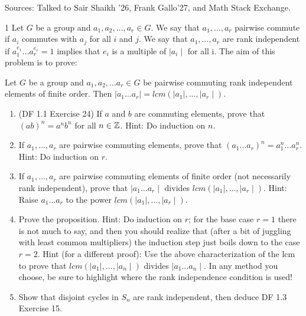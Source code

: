 \documentclass[12pt]{article}
\begin{document}


Sources: Talked to Sair Shaikh '26, Frank Gallo'27, and Math Stack Exchange. 
\begin{problem}{1}
    Let $G$ be a group and $a_1, a_2, \ldots, a_r \in G$. We say that $a_1, \ldots, a_r$ pairwise commute if $a_i$ commutes with $a_j$ for all $i$ and $j$. We say that $a_1, \ldots, a_r$ are rank independent if $a_1^{e_1} \ldots a_r^{e_r} =1$ implies that $e_i$ is a multiple of $\mid a_i \mid$ for all i. The aim of this problem is to prove: 
    \begin{proposition}
        Let $G$ be a group and $a_1, a_2, \ldots a_r \in G$ be pairwise commuting rank independent elements of finite order. Then $\mid a_1 \ldots a_r \mid = lcm(\mid a_1 \mid, \ldots, \mid a_r \mid)$. 
    \end{proposition}
    \begin{enumerate}
        \item (DF 1.1 Exercise 24) If $a$ and $b$ are commuting elements, prove that $(ab) ^n = a^nb^n$ for all $n \in \mathbb Z$. Hint: Do induction on $n$.
        \item If $a_1, \ldots, a_r$ are pairwise commuting elements, prove that $(a_1\ldots a_r)^n = a_1^n \ldots a_r^n$. Hint: Do induction on $r$.
        \item If $a_1, \ldots, a_r$ are pairwise commuting elements of finite order (not necessarily rank independent), prove that $\mid a_1 \ldots a_r \mid$ divides $lcm(\mid a_1 \mid, \ldots, \mid a_r \mid)$. Hint: Raise $a_1 \ldots a_r$ to the power $lcm(\mid a_1 \mid, \ldots, \mid a_r \mid)$. 
        \item Prove the proposition. Hint: Do induction on $r$; for the base case $r = 1$ there is not much to say, and then you should realize that (after a bit of juggling with least common multipliers) the induction step just boils down to the case $r = 2$. Hint (for a different proof): Use the above characterization of the lcm to prove that $lcm(\mid a_1 \mid, \ldots, \mid a_n \mid)$ divides $\mid a_1 \ldots a_n \mid$. In any method you choose, be sure to highlight where the rank independence condition is used!
        \item Show that disjoint cycles in $S_n$ are rank independent, then deduce DF 1.3 Exercise 15.
    \end{enumerate}
\end{problem}
\end{document}
